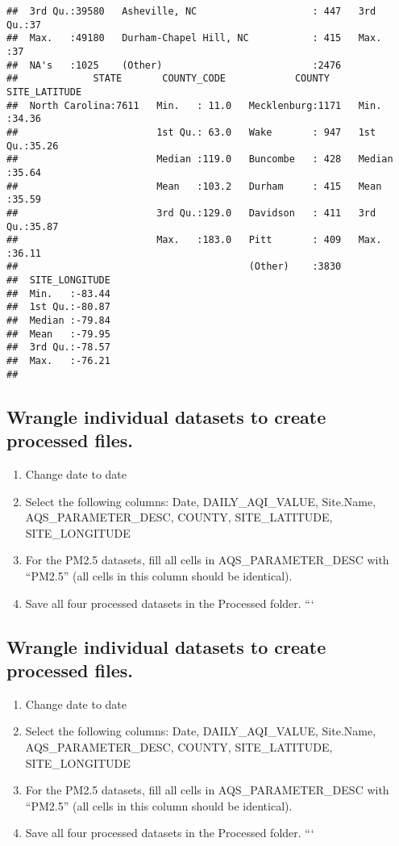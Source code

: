 \documentclass[]{article}
\providecommand{\tightlist}{%
  \setlength{\itemsep}{0pt}\setlength{\parskip}{0pt}}
\begin{document}
\begin{verbatim}
##  3rd Qu.:39580   Asheville, NC                    : 447   3rd Qu.:37  
##  Max.   :49180   Durham-Chapel Hill, NC           : 415   Max.   :37  
##  NA's   :1025    (Other)                          :2476               
##             STATE       COUNTY_CODE            COUNTY     SITE_LATITUDE  
##  North Carolina:7611   Min.   : 11.0   Mecklenburg:1171   Min.   :34.36  
##                        1st Qu.: 63.0   Wake       : 947   1st Qu.:35.26  
##                        Median :119.0   Buncombe   : 428   Median :35.64  
##                        Mean   :103.2   Durham     : 415   Mean   :35.59  
##                        3rd Qu.:129.0   Davidson   : 411   3rd Qu.:35.87  
##                        Max.   :183.0   Pitt       : 409   Max.   :36.11  
##                                        (Other)    :3830                  
##  SITE_LONGITUDE  
##  Min.   :-83.44  
##  1st Qu.:-80.87  
##  Median :-79.84  
##  Mean   :-79.95  
##  3rd Qu.:-78.57  
##  Max.   :-76.21  
## 
\end{verbatim}

\subsection{Wrangle individual datasets to create processed
files.}\label{wrangle-individual-datasets-to-create-processed-files.}

\begin{enumerate}
\def\labelenumi{\arabic{enumi}.}
\setcounter{enumi}{2}
\tightlist
\item
  Change date to date
\item
  Select the following columns: Date, DAILY\_AQI\_VALUE, Site.Name,
  AQS\_PARAMETER\_DESC, COUNTY, SITE\_LATITUDE, SITE\_LONGITUDE
\item
  For the PM2.5 datasets, fill all cells in AQS\_PARAMETER\_DESC with
  ``PM2.5'' (all cells in this column should be identical).
\item
  Save all four processed datasets in the Processed folder. ```
\end{enumerate}

\subsection{Wrangle individual datasets to create processed
files.}\label{wrangle-individual-datasets-to-create-processed-files.-1}

\begin{enumerate}
\def\labelenumi{\arabic{enumi}.}
\setcounter{enumi}{2}
\tightlist
\item
  Change date to date
\item
  Select the following columns: Date, DAILY\_AQI\_VALUE, Site.Name,
  AQS\_PARAMETER\_DESC, COUNTY, SITE\_LATITUDE, SITE\_LONGITUDE
\item
  For the PM2.5 datasets, fill all cells in AQS\_PARAMETER\_DESC with
  ``PM2.5'' (all cells in this column should be identical).
\item
  Save all four processed datasets in the Processed folder. ```
\end{enumerate}
\end{document}
